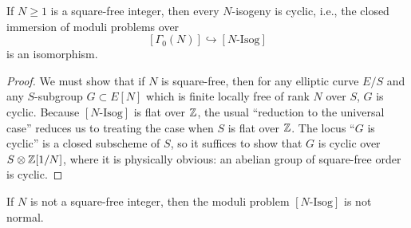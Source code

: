\begin{kcor}\label{cor:6.8.7}
If $N \ge 1$ is a square-free integer, then every $N$-isogeny is cyclic, i.e., the closed immersion of moduli problems over \Ell
\[
[\Gamma_0(N)] \hookrightarrow [N\text{-Isog}]
\]
is an isomorphism.
\end{kcor}

\begin{proof}
We must show that if $N$ is square-free, then for any elliptic curve $E/S$ and any $S$-subgroup $G \subset E[N]$ which is finite locally free of rank $N$ over $S$, $G$ is cyclic. Because $[N\text{-Isog}]$ is flat over $\mathbb{Z}$, the usual ``reduction to the universal case'' reduces us to treating the case when $S$ is flat over $\mathbb{Z}$. The locus ``$G$ is cyclic'' is a closed subscheme of $S$, so it suffices to show that $G$ is cyclic over $S \otimes \mathbb{Z}[1/N]$, where it is physically obvious: an abelian group of square-free order is cyclic.
\end{proof}

\begin{kthm}\label{thm:6.8.8}
If $N$ is not a square-free integer, then the moduli problem $[N\text{-Isog}]$ is not normal.
\end{kthm}

